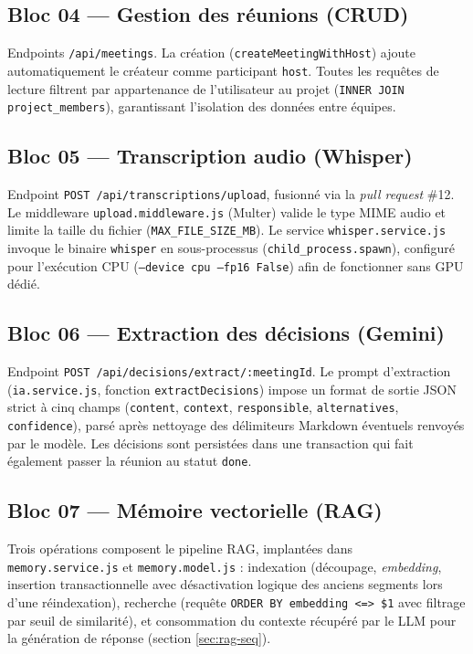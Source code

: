\documentclass[12pt, a4paper]{article}
\begin{document}
\subsection{Bloc 04 — Gestion des réunions (CRUD)}

Endpoints \texttt{/api/meetings}. La création (\texttt{createMeetingWithHost}) ajoute automatiquement le créateur comme participant \texttt{host}. Toutes les requêtes de lecture filtrent par appartenance de l'utilisateur au projet (\texttt{INNER JOIN project\_members}), garantissant l'isolation des données entre équipes.

\subsection{Bloc 05 — Transcription audio (Whisper)}

Endpoint \texttt{POST /api/transcriptions/upload}, fusionné via la \textit{pull request} \#12. Le middleware \texttt{upload.middleware.js} (Multer) valide le type MIME audio et limite la taille du fichier (\texttt{MAX\_FILE\_SIZE\_MB}). Le service \texttt{whisper.service.js} invoque le binaire \texttt{whisper} en sous-processus (\texttt{child\_process.spawn}), configuré pour l'exécution CPU (\texttt{--device cpu --fp16 False}) afin de fonctionner sans GPU dédié.

\subsection{Bloc 06 — Extraction des décisions (Gemini)}

Endpoint \texttt{POST /api/decisions/extract/:meetingId}. Le prompt d'extraction (\texttt{ia.service.js}, fonction \texttt{extractDecisions}) impose un format de sortie JSON strict à cinq champs (\texttt{content}, \texttt{context}, \texttt{responsible}, \texttt{alternatives}, \texttt{confidence}), parsé après nettoyage des délimiteurs Markdown éventuels renvoyés par le modèle. Les décisions sont persistées dans une transaction qui fait également passer la réunion au statut \texttt{done}.

\subsection{Bloc 07 — Mémoire vectorielle (RAG)}

Trois opérations composent le pipeline RAG, implantées dans \texttt{memory.service.js} et \texttt{memory.model.js} : indexation (découpage, \textit{embedding}, insertion transactionnelle avec désactivation logique des anciens segments lors d'une réindexation), recherche (requête \texttt{ORDER BY embedding <=> \$1} avec filtrage par seuil de similarité), et consommation du contexte récupéré par le LLM pour la génération de réponse (section \ref{sec:rag-seq}).
\end{document}
